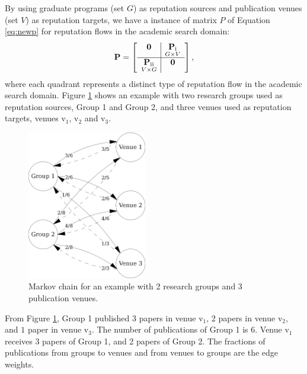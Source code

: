 \documentclass[msc]{ppgccufmg}
\begin{document}
By using graduate programs (set $G$) as reputation sources and publication venues (set $V$) as reputation targets, we have a instance of matrix $P$ of Equation \ref{eq:newp} for reputation flows in the academic search domain:
\begin{align}\label{eq:newp2}
{\bf P} =
\left[
\begin{array}{c | c}
	\textbf{0}  & \underset{G \times V}{{\bf P}_{\text{i}}} \\
	\hline
	\underset{V \times G}{{\bf P}_{\text{ii}}}  & \textbf{0} \\
\end{array}
\right],
\end{align}
where each quadrant represents a distinct type of reputation flow in the academic search domain. 
%
Figure \ref{fig:ex1-MC} shows an example with two research groups used as reputation sources, Group 1 and Group 2, and three venues used as reputation targets, venues $\mbox{v}_1$, $\mbox{v}_2$ and $\mbox{v}_3$.

\begin{figure}[h]
   \centerline{\includegraphics[width=5.2cm]{fig/bhrscore-w3}}
   \caption{Markov chain for an example with 2 research groups and 3 publication venues.}
   \label{fig:ex1-MC}
\end{figure}

From Figure \ref{fig:ex1-MC}, Group 1 published $3$ papers in venue $\mbox{v}_1$, $2$ papers in venue $\mbox{v}_2$, and $1$ paper in venue $\mbox{v}_3$. The number of publications of Group 1 is $6$. Venue $\mbox{v}_1$ receives $3$ papers of Group 1, and 2 papers of Group 2. The fractions of publications from groups to venues and from venues to groups are the edge weights.


%
%
\end{document}
